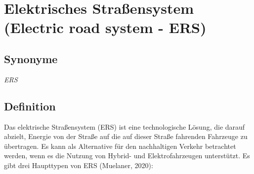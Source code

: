 \documentclass[
]{book}
\begin{document}
\hypertarget{ers}{%
\section{Elektrisches Straßensystem (Electric road system - ERS)}\label{ers}}

\hypertarget{synonyme-3}{%
\subsection*{Synonyme}\label{synonyme-3}}

\emph{ERS}

\hypertarget{definition-3}{%
\subsection*{Definition}\label{definition-3}}

Das elektrische Straßensystem (ERS) ist eine technologische Lösung, die darauf abzielt, Energie von der Straße auf die auf dieser Straße fahrenden Fahrzeuge zu übertragen. Es kann als Alternative für den nachhaltigen Verkehr betrachtet werden, wenn es die Nutzung von Hybrid- und Elektrofahrzeugen unterstützt. Es gibt drei Haupttypen von ERS (Muelaner, 2020):
\end{document}
